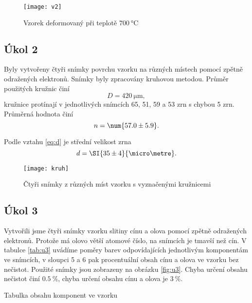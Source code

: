 \documentclass{protokol}
\begin{document}
    \begin{figure}[H]
      \centering 
      \texttt{[image: v2]}
      \vspace{5pt}
      \caption{Vzorek deformovaný při teplotě $\SI{700}{\celsius}$}
      \label{fig:v2}
    \end{figure}

    \subsection*{Úkol 2}

      Byly vytvořeny čtyři snímky povrchu vzorku na různých místech pomocí zpětně odražených elektronů. Snímky byly zpracovány kruhovou metodou. Průměr použitých kružnic činí 
      $$ D = \SI{420}{\micro\metre}, $$
      kružnice protínají v jednotlivých snímcích 65, 51, 59 a 53 zrn s chybou 5 zrn. Průměrná hodnota činí
      $$ n = \num{57.0 \pm 5.9}. $$

      Podle vztahu \eqref{eq:d} je střední velikost zrna 
      $$ d = \SI{35 \pm 4}{\micro\metre}. $$


      \begin{figure}[H]
        \centering
        \hspace*{-60pt}   
        \texttt{[image: kruh]}
        \hspace*{60pt}
        \vspace{-15pt}
        \caption{Čtyři snímky z různých míst vzorku s vyznačenými kružnicemi}
        \label{fig:kruh}
      \end{figure}

    \subsection*{Úkol 3}

      Vytvořili jsme čtyři snímky vzorku slitiny cínu a olova pomocí zpětně odražených elektronů. Protože má olovo větší atomové číslo, na snímcích je tmavší než cín. V tabulce \ref{tab:u3} uvádíme poměry barev odpovídajících jednotlivým komponentám ve snímcích, v sloupci 5 a 6 pak procentuální obsah cínu a olova ve vzorku bez nečistot. Použité snímky jsou zobrazeny na obrázku \ref{fig:u3}. Chyba určení obsahu nečistot činí $\SI{0.5}{\percent}$, chyba určení obsahu cínu a olova je $\SI{3}{\percent}$.

      \begin{table}[H]
        \centering
        \setlength{\tabcolsep}{10pt}
        
        \caption{Tabulka obsahu komponent ve vzorku}
        \label{tab:u3}
      \end{table}
\end{document}
